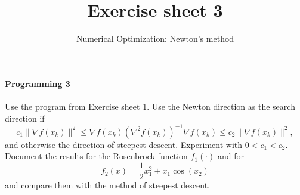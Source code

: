 
\subtitle{Numerical Optimization: Newton's method}
\title{Exercise sheet 3}
\date{}
\usepackage{amsmath}
\newcommand\tp{\ensuremath{\text{\upshape T}}}

\maketitle

\vspace{-12ex}

\paragraph{Programming 3}
Use the program from Exercise sheet 1. Use the Newton direction as the search
direction if
\[
c_1 \|\nabla f(x_k)\|^2
\le \nabla f(x_k)(\nabla^2 f(x_k))^{-1} \nabla f(x_k)
\le c_2 \|\nabla f(x_k)\|^2,
\]
and otherwise the direction of steepest descent. Experiment with $0<c_1<c_2$.
Document the results for the Rosenbrock function $f_1(\cdot)$ and for
\[
f_2(x) = \frac{1}{2}x_1^2 + x_1\cos(x_2)
\]
and compare them with the method of steepest descent.


